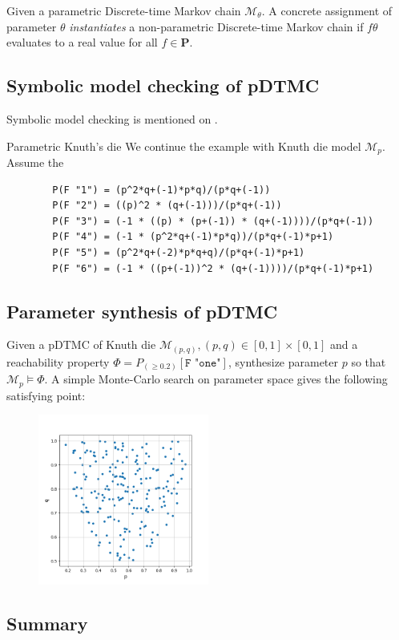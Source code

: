 Given a parametric Discrete-time Markov chain $\mathcal{M}_\theta$. A concrete assignment of parameter $\theta$
\textit{instantiates} a non-parametric Discrete-time Markov chain if $f{\theta}$ evaluates to a
real value for all $f\in\mathbf{P}$.

\subsection{Symbolic model checking of pDTMC}
Symbolic model checking is mentioned on \cite{daws2004symbolic}.
\begin{example}{Parametric Knuth's die}
    We continue the example with Knuth die model $\mathcal{M}_{p}$. Assume the
    \begin{lstlisting}
        P(F "1") = (p^2*q+(-1)*p*q)/(p*q+(-1))
        P(F "2") = ((p)^2 * (q+(-1)))/(p*q+(-1))
        P(F "3") = (-1 * ((p) * (p+(-1)) * (q+(-1))))/(p*q+(-1))
        P(F "4") = (-1 * (p^2*q+(-1)*p*q))/(p*q+(-1)*p+1)
        P(F "5") = (p^2*q+(-2)*p*q+q)/(p*q+(-1)*p+1)
        P(F "6") = (-1 * ((p+(-1))^2 * (q+(-1))))/(p*q+(-1)*p+1)
    \end{lstlisting}
\end{example}

\subsection{Parameter synthesis of pDTMC}

\begin{example}
    Given a pDTMC of Knuth die $\mathcal{M}_{(p,q)}, (p,q)\in[0,1]\times[0,1] $ and a reachability property $\Phi = P_(\geq 0.2)
        [\texttt{F "one"}]$, synthesize parameter $p$ so that $\mathcal{M}_{p} \models \Phi$. A simple
    Monte-Carlo search on parameter space gives the following satisfying point:
    \begin{figure}[H]
        \centering
        \includegraphics[width=0.5\textwidth]{figures/knuth_die_trueparams.png}
        \label{fig:knuth-die-pq}
    \end{figure}
\end{example}

\subsection{Summary}